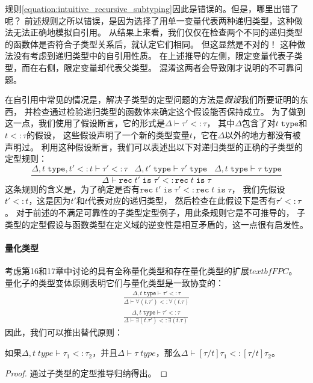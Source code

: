 规则\ref{equation:intuitive_recursive_subtyping}因此是错误的。但是，哪里出错了呢？
前述规则之所以错误，是因为选择了用单一变量代表两种递归类型，这种做法无法正确地模拟自引用。
从结果上来看，我们仅仅在检查两个不同的递归类型的函数体是否符合子类型关系后，就认定它们相同。
但这显然是不对的！
这种做法没有考虑到递归类型中的自引用性质。
在上述推导的左侧，限定变量代表子类型，而在右侧，限定变量却代表父类型。
混淆这两者会导致刚才说明的不可靠问题。

在自引用中常见的情况是，解决子类型的定型问题的方法是\textit{假设}我们所要证明的东西，
并检查通过检验递归类型的函数体来确定这个假设能否保持成立。
为了做到这一点，我们使用了假设断言，它的形式是$\Delta\vdash\tau{'}<:\tau$，
其中$\Delta$包含了对$t\;\texttt{type}$和$t<:\tau$的假设，
这些假设声明了一个新的类型变量$t$，它在$\Delta$以外的地方都没有被声明过。
利用这种假设断言，我们可以表述出以下对递归类型的正确的子类型的定型规则：
\begin{equation}
    \frac{\Delta,t\;\texttt{type},t{'}<:t\vdash \tau{'}<:\tau\;\;\;\Delta,t{'}\;\texttt{type}\vdash \tau{'}\;\texttt{type}\;\;\;\Delta,t\;\texttt{type}\vdash \tau\;\texttt{type}}
    {\Delta\vdash\texttt{rec}\;t{'}\;\texttt{is}\;\tau{'}<:\texttt{rec}\;t\;\texttt{is}\;\tau}
\end{equation}
这条规则的含义是，为了确定是否有$\texttt{rec}\;t{'}\;\texttt{is}\;\tau{'}<:\texttt{rec}\;t\;\texttt{is}\;\tau$，
我们先假设$t{'}<:t$，这是因为$t{'}$和$t$代表对应的递归类型，
然后检查在此假设下是否有$\tau{'}<:\tau$。
对于前述的不满足可靠性的子类型定型例子，用此条规则它是不可推导的，
子类型的定型假设与函数类型在定义域的逆变性是相互矛盾的，这一点很有启发性。

\paragraph{量化类型}
考虑第16和17章中讨论的具有全称量化类型和存在量化类型的扩展$textbf{FPC}$。
量化子的类型变体原则表明它们与量化类型是一致协变的：
\begin{subequations}
    \begin{gather}
        \frac{\Delta,t\;\texttt{type}\vdash \tau{'}<:\tau}
        {\Delta\vdash\forall(t.\tau{'})<:\forall(t.\tau)}
        \\
        \frac{\Delta,t\;\texttt{type}\vdash \tau{'}<:\tau}
        {\Delta\vdash\exists(t.\tau{'})<:\exists(t.\tau)}
    \end{gather}
\end{subequations}
因此，我们可以推出替代原则：
\begin{lemma}
    如果$\Delta,t\;type\vdash\tau_1<:\tau_2$，并且$\Delta\vdash\tau\;type$，那么$\Delta\vdash[\tau / t]\tau_1<:[\tau/t]\tau_2$。
\end{lemma}
\begin{proof}
    通过子类型的定型推导归纳得出。
\end{proof}

